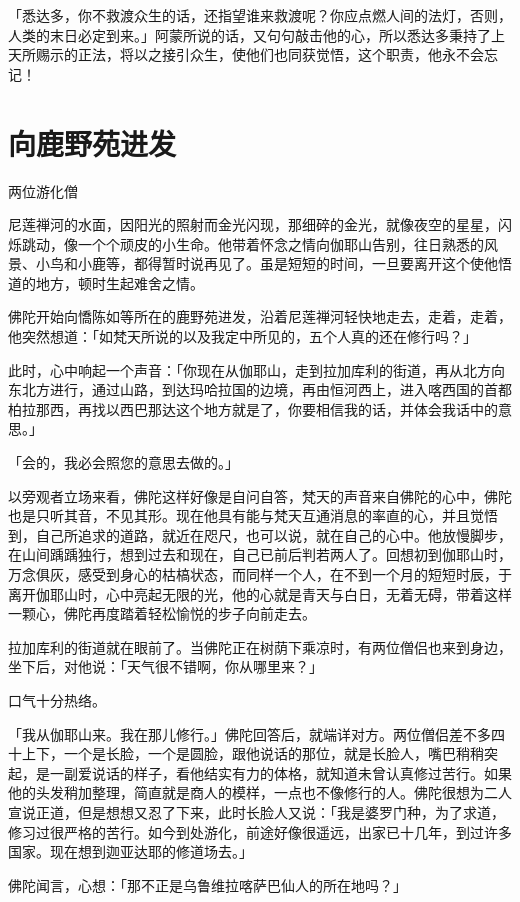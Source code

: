 \documentclass[12pt,twoside,openany]{book}
\begin{document}
「悉达多，你不救渡众生的话，还指望谁来救渡呢？你应点燃人间的法灯，否则，人类的末日必定到来。」阿蒙所说的话，又句句敲击他的心，所以悉达多秉持了上天所赐示的正法，将以之接引众生，使他们也同获觉悟，这个职责，他永不会忘记！

\section{向鹿野苑进发}\label{sec2.2}

两位游化僧

尼莲禅河的水面，因阳光的照射而金光闪现，那细碎的金光，就像夜空的星星，闪烁跳动，像一个个顽皮的小生命。他带着怀念之情向伽耶山告别，往日熟悉的风景、小鸟和小鹿等，都得暂时说再见了。虽是短短的时间，一旦要离开这个使他悟道的地方，顿时生起难舍之情。

佛陀开始向憍陈如等所在的鹿野苑进发，沿着尼莲禅河轻快地走去，走着，走着，他突然想道：「如梵天所说的以及我定中所见的，五个人真的还在修行吗？」

此时，心中响起一个声音：「你现在从伽耶山，走到拉加库利的街道，再从北方向东北方进行，通过山路，到达玛哈拉国的边境，再由恒河西上，进入喀西国的首都柏拉那西，再找以西巴那达这个地方就是了，你要相信我的话，并体会我话中的意思。」

「会的，我必会照您的意思去做的。」

以旁观者立场来看，佛陀这样好像是自问自答，梵天的声音来自佛陀的心中，佛陀也是只听其音，不见其形。现在他具有能与梵天互通消息的率直的心，并且觉悟到，自己所追求的道路，就近在咫尺，也可以说，就在自己的心中。他放慢脚步，在山间踽踽独行，想到过去和现在，自己已前后判若两人了。回想初到伽耶山时，万念俱灰，感受到身心的枯槁状态，而同样一个人，在不到一个月的短短时辰，于离开伽耶山时，心中亮起无限的光，他的心就是青天与白日，无着无碍，带着这样一颗心，佛陀再度踏着轻松愉悦的步子向前走去。

拉加库利的街道就在眼前了。当佛陀正在树荫下乘凉时，有两位僧侣也来到身边，坐下后，对他说：「天气很不错啊，你从哪里来？」

口气十分热络。

「我从伽耶山来。我在那儿修行。」佛陀回答后，就端详对方。两位僧侣差不多四十上下，一个是长脸，一个是圆脸，跟他说话的那位，就是长脸人，嘴巴稍稍突起，是一副爱说话的样子，看他结实有力的体格，就知道未曾认真修过苦行。如果他的头发稍加整理，简直就是商人的模样，一点也不像修行的人。佛陀很想为二人宣说正道，但是想想又忍了下来，此时长脸人又说：「我是婆罗门种，为了求道，修习过很严格的苦行。如今到处游化，前途好像很遥远，出家已十几年，到过许多国家。现在想到迦亚达耶的修道场去。」

佛陀闻言，心想：「那不正是乌鲁维拉喀萨巴仙人的所在地吗？」
\end{document}
